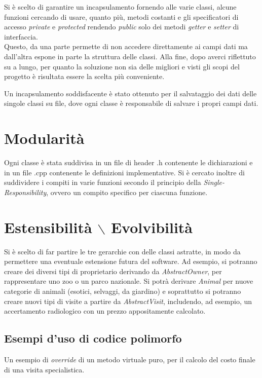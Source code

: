 Si è scelto di garantire un incapsulamento fornendo alle varie classi, alcune funzioni cercando di usare, quanto più, metodi costanti e  gli specificatori di accesso \textit{private} e \textit{protected} rendendo \textit{public} solo dei metodi \textit{getter} e \textit{setter} di interfaccia.
\\Questo, da una parte permette di non accedere direttamente ai campi dati ma dall'altra espone in parte la struttura delle classi.
Alla fine, dopo averci riflettuto su a lungo, per quanto la soluzione non sia delle migliori e visti gli scopi del progetto è risultata essere la scelta più conveniente.  

Un incapsulamento soddisfacente è stato ottenuto per il salvataggio dei dati delle singole classi su file, dove ogni classe è responsabile di salvare i propri campi dati.

\section{Modularità}

Ogni classe è stata suddivisa in un file di header .h contenente le dichiarazioni e in un file .cpp contenente le definizioni implementative. Si è cercato inoltre di suddividere i compiti in varie funzioni secondo il principio della \textit{Single-Responsibility}, ovvero un compito specifico per ciascuna funzione.

\section{Estensibilità $\backslash$ Evolvibilità}

Si è scelto di far partire le tre gerarchie con delle classi astratte, in modo da permettere una eventuale estensione futura del software. 
Ad esempio, si potranno creare dei diversi tipi di proprietario derivando da \textit{AbstractOwner}, per rappresentare uno zoo o un parco nazionale. 
Si potrà derivare \textit{Animal} per nuove categorie di animali (esotici, selvaggi, da giardino) e soprattutto si potranno creare nuovi tipi di visite a partire da \textit{AbstractVisit}, includendo, ad esempio, un accertamento radiologico con un prezzo appositamente calcolato.
\\ 

\subsection{Esempi d'uso di codice polimorfo}
 
Un esempio di \textit{override} di un metodo virtuale puro, per il calcolo del costo finale di una visita specialistica.\\

